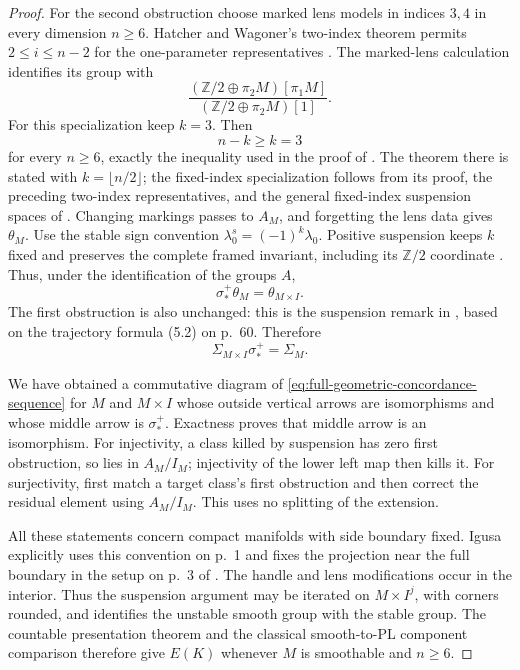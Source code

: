\begin{proof}
For the second obstruction choose marked lens models in indices $3,4$
in every dimension $n\geq6$.  Hatcher and Wagoner's two-index theorem
permits $2\leq i\leq n-2$ for the one-parameter representatives
\cite[Part~I, Chapter~V, Theorem~3.1(a), p.~184;
Part~II, Section~2, p.~244]{HatcherWagoner1973}.
The marked-lens calculation identifies its group with
\[
 \frac{(\mathbb Z/2\oplus\pi_2M)[\pi_1M]}
      {(\mathbb Z/2\oplus\pi_2M)[1]}.
\]
For this specialization keep $k=3$. Then
\[
                         n-k\geq k=3
\]
for every $n\geq6$, exactly the inequality used in the proof of
\cite[Lemma~1.10, p.~9]{Igusa2021SecondObstructionI}.
The theorem there is stated with $k=\lfloor n/2\rfloor$; the
fixed-index specialization follows from its proof, the preceding
two-index representatives, and the general fixed-index suspension
spaces of \cite[Section~4.2, pp.~8--9]{Igusa2021Dimension3}.
Changing markings passes to $A_M$, and forgetting the lens data gives
$\theta_M$.  Use the stable sign convention
$\lambda^s_0=(-1)^k\lambda_0$.
Positive suspension keeps $k$ fixed and preserves the complete framed
invariant, including its $\mathbb Z/2$ coordinate
\cite[Section~4.2, pp.~8--9]{Igusa2021Dimension3}.  Thus, under the
identification of the groups $A$,
\[
                  \sigma^+_*\theta_M=\theta_{M\times I}.
\]
The first obstruction is also unchanged: this is the suspension remark
in \cite[Part~I, Chapter~IV, Section~1, p.~130]{HatcherWagoner1973},
based on the trajectory formula (5.2) on p.~60.  Therefore
\[
                    \Sigma_{M\times I}\sigma^+_*=\Sigma_M.
\]

We have obtained a commutative diagram of
\eqref{eq:full-geometric-concordance-sequence} for $M$ and $M\times I$
whose outside vertical arrows are isomorphisms and whose middle arrow
is $\sigma^+_*$.  Exactness proves that middle arrow is an isomorphism.
For injectivity, a class killed by suspension has zero first obstruction,
so lies in $A_M/I_M$; injectivity of the lower left map then kills it.
For surjectivity, first match a target class's first obstruction and then
correct the residual element using $A_M/I_M$.  This uses no splitting
of the extension.

All these statements concern compact manifolds with side boundary
fixed.  Igusa explicitly uses this convention on p.~1 and fixes the
projection near the full boundary in the setup on p.~3 of
\cite{Igusa2021SecondObstructionI}.  The handle and lens modifications
occur in the interior.  Thus the suspension argument may be iterated
on $M\times I^j$, with corners rounded, and identifies the unstable
smooth group with the stable group.  The countable presentation theorem
and the classical smooth-to-PL component comparison therefore give
$E(K)$ whenever $M$ is smoothable and $n\geq6$.


\end{proof}
